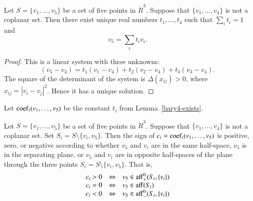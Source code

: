 \begin{tarskidata}
\begin{tarski}

\begin{lemma}
Let $S=\{v_1,\ldots,v_5\}$ be
a set of five points in $\ring{R}^3$.  Suppose
that $\{v_1,\ldots,v_4\}$ is not a coplanar
set.    Then there exist unique real numbers
$t_1,\ldots,t_4$ such that $\sum_i t_i = 1$ and
	$$v_5 = \sum_i t_i v_i.$$
\end{lemma}

\begin{proof}  This is a linear system with
three unknowns:
	$$(v_5- v_4) = t_1 (v_1-v_4) +
		t_2 (v_2-v_4) + t_3 (v_3-v_4).
	$$
The
square of the
determinant of the system is
$\Delta(x_{ij}) >0$, where $x_{ij}=|v_i-v_j|^2$.
Hence it has a unique solution.
\end{proof}
\end{tarski}



\begin{tarski}

\begin{definition}[coef]
Let ${\operatorname{coef}}_i(v_1,\ldots,v_5)$
be the constant $t_i$ from Lemma~\ref{bary4-exists}.
\end{definition}
\end{tarski}




\begin{tarski}

\begin{lemma}
Let $S=\{v_1,\ldots,v_5\}$ be
a set of five points in $\ring{R}^3$.  Suppose
that $\{v_1,\ldots,v_4\}$ is not a coplanar
set.  Set $S_i=S\setminus \{v_i,v_5\}$. Then the sign of 
$c_i={\operatorname{coef}}_i(v_1,\ldots,v_5)$ is positive,
zero, or negative according to whether $v_5$
and $v_i$ are in the same half-space, $v_5$
is in the separating plane, or $v_5$ and $v_i$
are in opposite half-spaces of the plane
through the three points $S_i=S\setminus\{v_i,v_5\}$.
That is,
  $$
  \begin{array}{lll}
   c_i > 0 &\Leftrightarrow   &v_5\in{\operatorname{aff}}_+^0(S_i,\{v_i\})\\
   c_i = 0 &\Leftrightarrow   &v_5\in{\operatorname{aff}}(S_i)\\
   c_i < 0 &\Leftrightarrow   &v_5\in{\operatorname{aff}}_-^0(S_i,\{v_i\})\\
    \end{array}
  $$
\end{lemma}


\end{tarski}
\end{tarskidata}
